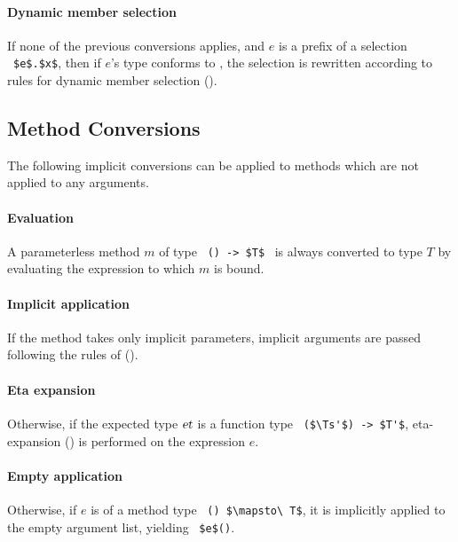 \paragraph{Dynamic member selection}
If none of the previous conversions applies, and $e$ is a prefix of a selection ~\lstinline!$e$.$x$!, then if $e$'s type conforms to , the selection is rewritten according to rules for dynamic member selection (). 






\subsection{Method Conversions}
\label{sec:method-conversions}

The following implicit conversions can be applied to methods which are not applied to any arguments. 

\paragraph{Evaluation}
A parameterless method $m$ of type ~\lstinline!() -> $T$!~ is always converted to type $T$ by evaluating the expression to which $m$ is bound. 

\paragraph{Implicit application}
If the method takes only implicit parameters, implicit arguments are passed following the rules of ().

\paragraph{Eta expansion}
Otherwise, if the expected type $\mbox{\sl et}$ is a function type ~\lstinline!($\Ts'$) -> $T'$!, eta-expansion () is performed on the expression $e$. 

\paragraph{Empty application}
Otherwise, if $e$ is of a method type ~\lstinline!() $\mapsto\ T$!, it is implicitly applied to the empty argument list, yielding ~\lstinline!$e$()!. 






